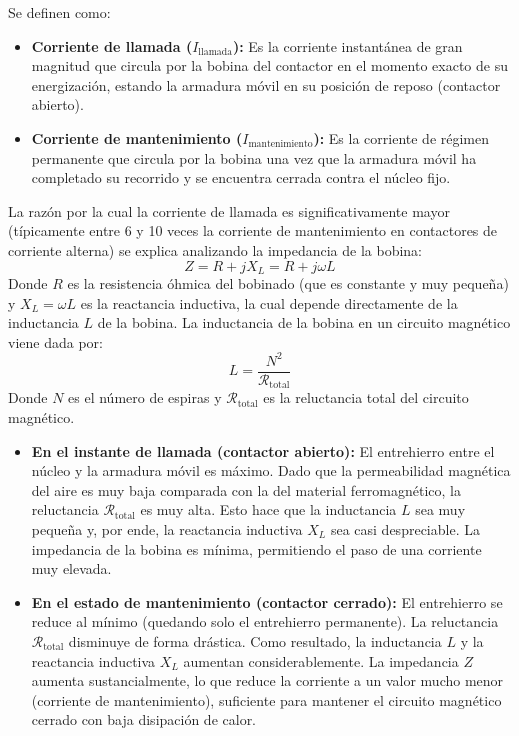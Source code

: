 \begin{enumerate}
    Se definen como:
    \begin{itemize}
        \item \textbf{Corriente de llamada ($I_{\text{llamada}}$):} Es la corriente instantánea de gran magnitud que circula por la bobina del contactor en el momento exacto de su energización, estando la armadura móvil en su posición de reposo (contactor abierto).
        \item \textbf{Corriente de mantenimiento ($I_{\text{mantenimiento}}$):} Es la corriente de régimen permanente que circula por la bobina una vez que la armadura móvil ha completado su recorrido y se encuentra cerrada contra el núcleo fijo.
    \end{itemize}

    La razón por la cual la corriente de llamada es significativamente mayor (típicamente entre 6 y 10 veces la corriente de mantenimiento en contactores de corriente alterna) se explica analizando la impedancia de la bobina:
    \begin{equation}
        Z = R + jX_L = R + j\omega L
    \end{equation}
    Donde $R$ es la resistencia óhmica del bobinado (que es constante y muy pequeña) y $X_L = \omega L$ es la reactancia inductiva, la cual depende directamente de la inductancia $L$ de la bobina. La inductancia de la bobina en un circuito magnético viene dada por:
    \begin{equation}
        L = \frac{N^2}{\mathcal{R}_{\text{total}}}
    \end{equation}
    Donde $N$ es el número de espiras y $\mathcal{R}_{\text{total}}$ es la reluctancia total del circuito magnético.
    \begin{itemize}
        \item \textbf{En el instante de llamada (contactor abierto):} El entrehierro entre el núcleo y la armadura móvil es máximo. Dado que la permeabilidad magnética del aire es muy baja comparada con la del material ferromagnético, la reluctancia $\mathcal{R}_{\text{total}}$ es muy alta. Esto hace que la inductancia $L$ sea muy pequeña y, por ende, la reactancia inductiva $X_L$ sea casi despreciable. La impedancia de la bobina es mínima, permitiendo el paso de una corriente muy elevada.
        \item \textbf{En el estado de mantenimiento (contactor cerrado):} El entrehierro se reduce al mínimo (quedando solo el entrehierro permanente). La reluctancia $\mathcal{R}_{\text{total}}$ disminuye de forma drástica. Como resultado, la inductancia $L$ y la reactancia inductiva $X_L$ aumentan considerablemente. La impedancia $Z$ aumenta sustancialmente, lo que reduce la corriente a un valor mucho menor (corriente de mantenimiento), suficiente para mantener el circuito magnético cerrado con baja disipación de calor.
    \end{itemize}


\end{enumerate}
